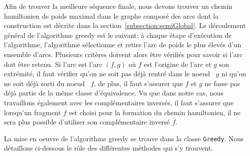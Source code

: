 Afin de trouver la meilleure séquence finale, nous devons trouver un chemin hamiltonien de poids maximal dans le graphe composé des arcs dont la construction est décrite dans la section~\ref{subsection:semiGlobal}. Le déroulement général de l'algorithme greedy est le suivant: à chaque étape d'exécution de l'algorithme, l'algorithme sélectionne et retire l'arc de poids le plus élevés d'un ensemble d'arcs. Plusieurs critères doivent alors être vérifiés pour savoir si l'arc doit être retenu. Si l'arc est l'arc $(f,g)$ où $f$ est l'origine de l'arc et $g$ son extrémité, il faut vérifier qu'on ne soit pas déjà rentré dans le \og noeud \fg~$g$ ni qu'on ne soit déjà sorti du \og noeud \fg~$f$, de plus, il faut s'assurer que $f$ et $g$ ne fasse pas déjà partie de la même classe d'équivalence. Vu que dans notre cas, nous travaillons également avec les complémentaires inversés, il faut s'assurer que lorsqu'un fragment $f$ est choisi pour la formation du chemin hamiltonien, il ne sera plus possible d'utiliser son complémentaire inversé $\overline{f}$.

La mise en oeuvre de l'algorithme greedy se trouve dans la classe \verb|Greedy|. Nous détaillons ci-dessous le rôle des différentes méthodes qui s'y trouvent.

